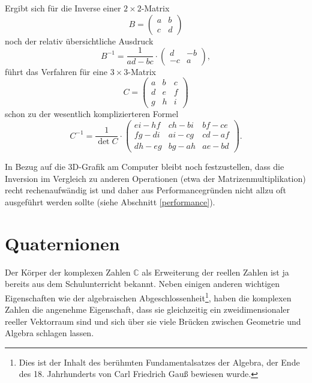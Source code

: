 Ergibt sich für die Inverse einer $2 \times 2$-Matrix
\begin{equation}
 B = \begin{pmatrix}
  a & b \\
  c & d
 \end{pmatrix}
\end{equation}
noch der relativ übersichtliche Ausdruck
\begin{equation}
 B^{-1} = \frac{1}{ad-bc} \cdot
 \begin{pmatrix}
  d & -b \\
  -c & a
 \end{pmatrix},
\end{equation}
führt das Verfahren für eine $3 \times 3$-Matrix
\begin{equation}
 C = \begin{pmatrix}
  a & b & c \\
  d & e & f \\
  g & h & i
 \end{pmatrix}
\end{equation}
schon zu der wesentlich komplizierteren Formel
\begin{equation}
 C^{-1} = \frac{1}{\det C} \cdot
 \begin{pmatrix}
  ei - hf & ch - bi & bf - ce \\
  fg - di & ai - cg & cd - af \\
  dh - eg & bg - ah & ae - bd
 \end{pmatrix}.
\end{equation}

In Bezug auf die 3D-Grafik am Computer bleibt noch festzustellen, dass die Inversion im Vergleich zu anderen Operationen (etwa der Matrizenmultiplikation) recht rechenaufwändig ist und daher aus Performancegründen nicht allzu oft ausgeführt werden sollte (siehe Abschnitt \ref{performance}).

\section{Quaternionen}
\label{quaternionmath}
Der Körper der komplexen Zahlen $\mathbb C$ als Erweiterung der reellen Zahlen ist ja bereits aus dem Schulunterricht bekannt. Neben einigen anderen wichtigen Eigenschaften wie der algebraischen Abgeschlossenheit\footnote{Dies ist der Inhalt des berühmten Fundamentalsatzes der Algebra, der Ende des 18. Jahrhunderts von Carl Friedrich Gauß bewiesen wurde.}, haben die komplexen Zahlen die angenehme Eigenschaft, dass sie gleichzeitig ein zweidimensionaler reeller Vektorraum sind und sich über sie viele Brücken zwischen Geometrie und Algebra schlagen lassen.

